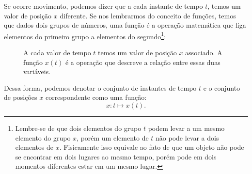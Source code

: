 Se ocorre movimento, podemos dizer que a cada instante de tempo $t$, temos um valor de posição $x$ diferente. Se nos lembrarmos do conceito de funções, temos que dados dois grupos de números, uma função é a operação matemática que liga elementos do primeiro grupo a elementos do segundo\footnote[][-2cm]{Lembre-se de que dois elementos do grupo $t$ podem levar a um mesmo elemento do grupo $x$, porém um elemento de $t$ não pode levar a dois elementos de $x$. Fisicamente isso equivale ao fato de que um objeto não pode se encontrar em dois lugares ao mesmo tempo, porém pode em dois momentos diferentes estar em um mesmo lugar.}:
\begin{figure}\forcerectofloat
\centering
{}
\caption{A cada valor de tempo $t$ temos um valor de posição $x$ associado. A função $x(t)$ é a operação que descreve a relação entre essas duas variáveis.}
\end{figure}

Dessa forma, podemos denotar o conjunto de instantes de tempo $t$ e o conjunto de posições $x$ correspondente como uma função:
\begin{equation}
    x: t \mapsto x(t).
\end{equation}

